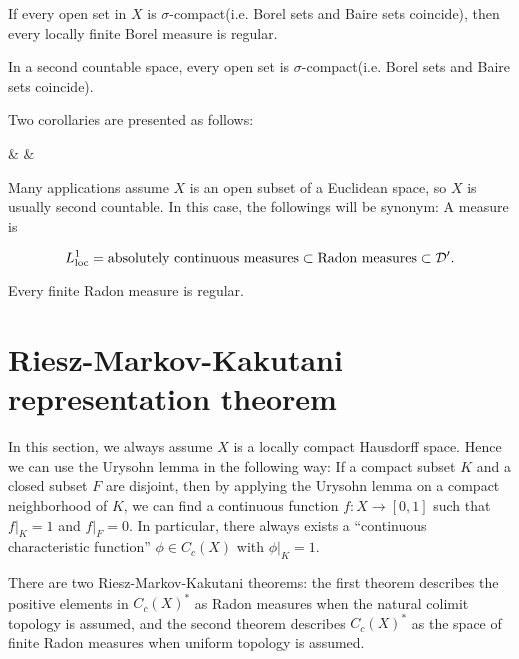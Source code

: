 \documentclass{../crs}
\begin{document}
\begin{thm}
If every open set in $X$ is $\sigma$-compact(i.e. Borel sets and Baire sets coincide), then every locally finite Borel measure is regular.
\end{thm}
\begin{prop}
In a second countable space, every open set is $\sigma$-compact(i.e. Borel sets and Baire sets coincide).
\end{prop}


Two corollaries are presented as follows:
\begin{rd}[column sep={120pt,between origins}]
  &
     &
  
\end{rd}


Many applications assume $X$ is an open subset of a Euclidean space, so $X$ is usually second countable.
In this case, the followings will be synonym: A measure is
\begin{cond}
\item 
\end{cond}



\[L_{\text{loc}}^1=\text{absolutely continuous measures}\subset\text{Radon measures}\subset\mathcal{D}'.\]


\begin{thm}
Every finite Radon measure is regular.
\end{thm}

\section{Riesz-Markov-Kakutani representation theorem}
In this section, we always assume $X$ is a locally compact Hausdorff space.
Hence we can use the Urysohn lemma in the following way: If a compact subset $K$ and a closed subset $F$ are disjoint, then by applying the Urysohn lemma on a compact neighborhood of $K$, we can find a continuous function $f:X\to[0,1]$ such that $f|_K=1$ and $f|_F=0$.
In particular, there always exists a ``continuous characteristic function'' $\phi\in C_c(X)$ with $\phi|_K=1$.

There are two Riesz-Markov-Kakutani theorems: the first theorem describes the positive elements in $C_c(X)^*$ as Radon measures when the natural colimit topology is assumed, and the second theorem describes $C_c(X)^*$ as the space of finite Radon measures when uniform topology is assumed.
\end{document}
